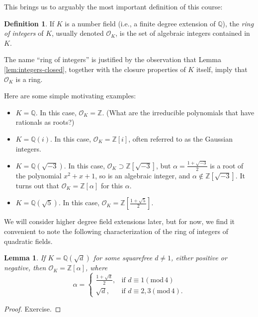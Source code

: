 \documentclass[12pt]{amsart}
\newtheorem{lemma}[theorem]{Lemma}
\theoremstyle{definition} \newtheorem*{notation}{Notation}
\theoremstyle{remark} \newtheorem*{remark}{Remark}
\theoremstyle{remark} \newtheorem*{example}{Example}
\theoremstyle{definition} \newtheorem*{definition}{Definition}
\numberwithin{equation}{section}
\numberwithin{theorem}{section}
\renewcommand{\pmod}[1]{\left(\mathrm{mod}\,#1\right)}
\begin{document}
	This brings us to arguably the most important definition of this course:
	
	\begin{definition}
		If $K$ is a number field (i.e., a finite degree extension of $\mathbb{Q}$), the \emph{ring of integers} of $K$, usually denoted $\mathcal{O}_K$, is the set of algebraic integers contained in $K$.
	\end{definition}
	
	The name ``ring of integers'' is justified by the observation that Lemma \ref{lem:integers-closed}, together with the closure properties of $K$ itself, imply that $\mathcal{O}_K$ is a ring.
	
	Here are some simple motivating examples:
		\begin{itemize}
			\item $K=\mathbb{Q}$.  In this case, $\mathcal{O}_K = \mathbb{Z}$.  (What are the irreducible polynomials that have rationals as roots?)
			\item $K=\mathbb{Q}(i)$.  In this case, $\mathcal{O}_K = \mathbb{Z}[i]$, often referred to as the Gaussian integers.
			\item $K=\mathbb{Q}(\sqrt{-3})$.  In this case, $\mathcal{O}_K \supset \mathbb{Z}[\sqrt{-3}]$, but $\alpha = \frac{1+\sqrt{-3}}{2}$ is a root of the polynomial $x^2+x+1$, so is an algebraic integer, and $\alpha \not\in \mathbb{Z}[\sqrt{-3}]$.  It turns out that $\mathcal{O}_K = \mathbb{Z}[\alpha]$ for this $\alpha$.
			\item $K=\mathbb{Q}(\sqrt{5})$.  In this case, $\mathcal{O}_K = \mathbb{Z}[\frac{1+\sqrt{5}}{2}]$.
		\end{itemize}
	We will consider higher degree field extensions later, but for now, we find it convenient to note the following characterization of the ring of integers of quadratic fields.
	
	\begin{lemma}\label{lem:quadratic-integers}
		If $K=\mathbb{Q}(\sqrt{d})$ for some squarefree $d \neq 1$, either positive or negative, then $\mathcal{O}_K = \mathbb{Z}[\alpha]$, where
			\[
				\alpha = 
					\begin{cases}
						\frac{1+\sqrt{d}}{2}, & \text{if } d \equiv 1\pmod{4} \\
						\sqrt{d}, & \text{if } d \equiv 2,3 \pmod{4}.
					\end{cases}
			\]
	\end{lemma}
	\begin{proof}
		Exercise.
	\end{proof}
	
\end{document}
